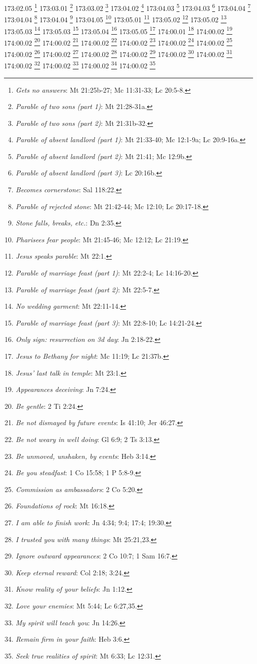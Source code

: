 173:02.05 \footnote{\textit{Gets no answers}: Mt 21:25b-27; Mc 11:31-33; Lc 20:5-8.}
173:03.01 \footnote{\textit{Parable of two sons (part 1)}: Mt 21:28-31a.}
173:03.02 \footnote{\textit{Parable of two sons (part 2)}: Mt 21:31b-32.}
173:04.02 \footnote{\textit{Parable of absent landlord (part 1)}: Mt 21:33-40; Mc 12:1-9a; Lc 20:9-16a.}
173:04.03 \footnote{\textit{Parable of absent landlord (part 2)}: Mt 21:41; Mc 12:9b.}
173:04.03 \footnote{\textit{Parable of absent landlord (part 3)}: Lc 20:16b.}
173:04.04 \footnote{\textit{Becomes cornerstone}: Sal 118:22.}
173:04.04 \footnote{\textit{Parable of rejected stone}: Mt 21:42-44; Mc 12:10; Lc 20:17-18.}
173:04.04 \footnote{\textit{Stone falls, breaks, etc.}: Dn 2:35.}
173:04.05 \footnote{\textit{Pharisees fear people}: Mt 21:45-46; Mc 12:12; Lc 21:19.}
173:05.01 \footnote{\textit{Jesus speaks parable}: Mt 22:1.}
173:05.02 \footnote{\textit{Parable of marriage feast (part 1)}: Mt 22:2-4; Lc 14:16-20.}
173:05.02 \footnote{\textit{Parable of marriage feast (part 2)}: Mt 22:5-7.}
173:05.03 \footnote{\textit{No wedding garment}: Mt 22:11-14.}
173:05.03 \footnote{\textit{Parable of marriage feast (part 3)}: Mt 22:8-10; Lc 14:21-24.}
173:05.04 \footnote{\textit{Only sign: resurrection on 3d day}: Jn 2:18-22.}
173:05.05 \footnote{\textit{Jesus to Bethany for night}: Mc 11:19; Lc 21:37b.}
174:00.01 \footnote{\textit{Jesus' last talk in temple}: Mt 23:1.}
174:00.02 \footnote{\textit{Appearances deceiving}: Jn 7:24.}
174:00.02 \footnote{\textit{Be gentle}: 2 Ti 2:24.}
174:00.02 \footnote{\textit{Be not dismayed by future events}: Is 41:10; Jer 46:27.}
174:00.02 \footnote{\textit{Be not weary in well doing}: Gl 6:9; 2 Ts 3:13.}
174:00.02 \footnote{\textit{Be unmoved, unshaken, by events}: Heb 3:14.}
174:00.02 \footnote{\textit{Be you steadfast}: 1 Co 15:58; 1 P 5:8-9.}
174:00.02 \footnote{\textit{Commission as ambassadors}: 2 Co 5:20.}
174:00.02 \footnote{\textit{Foundations of rock}: Mt 16:18.}
174:00.02 \footnote{\textit{I am able to finish work}: Jn 4:34; 9:4; 17:4; 19:30.}
174:00.02 \footnote{\textit{I trusted you with many things}: Mt 25:21,23.}
174:00.02 \footnote{\textit{Ignore outward appearances}: 2 Co 10:7; 1 Sam 16:7.}
174:00.02 \footnote{\textit{Keep eternal reward}: Col 2:18; 3:24.}
174:00.02 \footnote{\textit{Know reality of your beliefs}: Jn 1:12.}
174:00.02 \footnote{\textit{Love your enemies}: Mt 5:44; Lc 6:27,35.}
174:00.02 \footnote{\textit{My spirit will teach you}: Jn 14:26.}
174:00.02 \footnote{\textit{Remain firm in your faith}: Heb 3:6.}
174:00.02 \footnote{\textit{Seek true realities of spirit}: Mt 6:33; Lc 12:31.}
